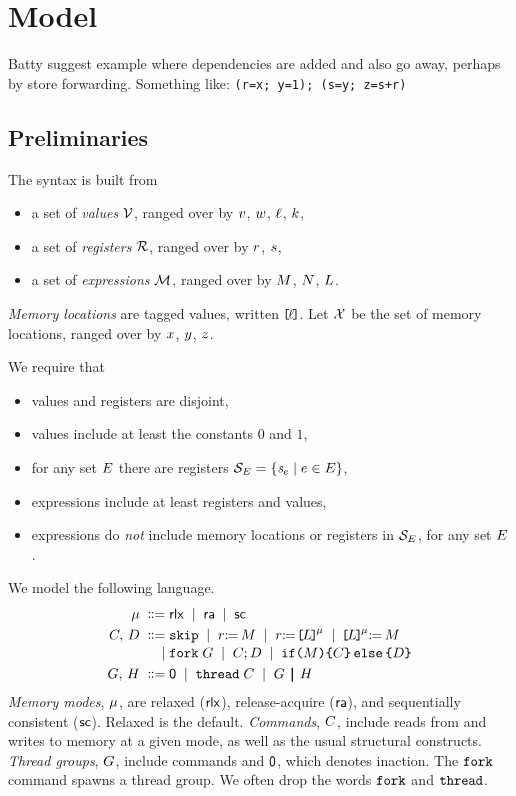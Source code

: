 \section{Model}

Batty suggest example where dependencies are added and also go away, perhaps
by store forwarding. Something like:
\texttt{(r=x; y=1); (s=y; z=s+r)}

\subsection{Preliminaries}
The syntax is built from
\begin{itemize}
\item a set of \emph{values} $\mathcal{V}$, ranged over by
  $v$, $w$, $\ell$, $k$,
\item a set of \emph{registers} $\mathcal{R}$, ranged over by
  $r$, $s$,
\item a set of \emph{expressions} $\mathcal{M}$, ranged over by
  $M$, $N$,  $L$.
\end{itemize}
\emph{Memory locations} are tagged values, written $\mkern-2mu\texttt{[}\mkern-2mu\ell \mkern-2mu\texttt{]}\mkern-2mu$.  Let $\mathcal{X}$
be the set of memory locations, ranged over by $x$, $y$, $z$.

We require that
\begin{itemize}
\item values and registers are disjoint, 
\item values include at least the constants $0$ and $1$,  
\item for any set $E$ there are registers $\mathcal{S}_{E}=\{\mathit{s}_{e}\mid e\in E\}$,
\item expressions include at least registers and values, 
\item expressions do \emph{not} include memory locations or registers in
  $\mathcal{S}_{E}$, for any set $E$.
\end{itemize}
We model the following language.
\begin{align*}
  \amode \BNFDEF& \mRLX
  \BNFSEP \mRA 
  \BNFSEP \mSC
  \\
  \aCmd,\,\bCmd
  \BNFDEF& \SKIP
  \BNFSEP \LET{\aReg}{\aExp}
  \BNFSEP \PRREF[\amode]{\cExp}{\aReg}
  \BNFSEP \PWREF[\amode]{\cExp}{\aExp}
  \\[-.5ex]
  \BNFSEP& \FORK{\aGrp}
  \BNFSEP \aCmd \SEMI \bCmd
  \BNFSEP \IF{\aExp} \THEN \aCmd \ELSE \bCmd \FI
  \\
  \aGrp ,\,\bGrp
  \BNFDEF& \NIL
  \BNFSEP\THREAD{\aCmd}
  \BNFSEP\aGrp \PAR \bGrp
\end{align*}
\emph{Memory modes}, $\mu$, are {relaxed} (${\mathsf{rlx}}$), {release-acquire}
(${\mathsf{ra}}$), and {sequentially consistent} (${\mathsf{sc}}$).  Relaxed is the default.
%
\emph{Commands}, $C$, include reads from and writes to memory at a given
mode, as well as the usual structural constructs.
%
\emph{Thread groups}, $G$, include commands and $\mathsf{0}$, which denotes
inaction. %
%
The $\FORK{}$ command spawns a thread group.  We often drop the words
$\FORK{}$ and $\THREAD{}$.

